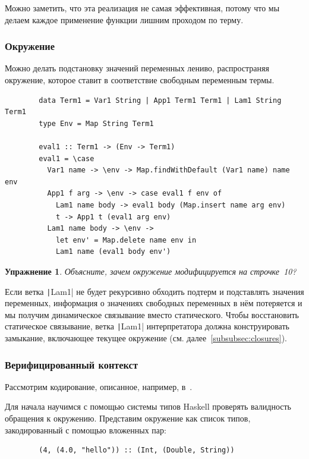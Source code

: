 \documentclass[12pt]{article}
\newtheorem{task}{Упражнение}
\begin{document}
    Можно заметить, что эта реализация не самая эффективная, потому что мы делаем каждое применение функции лишним проходом по терму.

    \subsubsection{Окружение}

    Можно делать подстановку значений переменных лениво, распространяя окружение, которое ставит в соответствие свободным переменным термы.

    \begin{verbatim}
        data Term1 = Var1 String | App1 Term1 Term1 | Lam1 String Term1
        type Env = Map String Term1

        eval1 :: Term1 -> (Env -> Term1)
        eval1 = \case
          Var1 name -> \env -> Map.findWithDefault (Var1 name) name env
          App1 f arg -> \env -> case eval1 f env of
            Lam1 name body -> eval1 body (Map.insert name arg env)
            t -> App1 t (eval1 arg env)
          Lam1 name body -> \env ->
            let env' = Map.delete name env in
            Lam1 name (eval1 body env')
    \end{verbatim}

    \begin{task}
        Объясните, зачем окружение модифицируется на строчке~10?
    \end{task}

    Если ветка \texttt|Lam1| не будет рекурсивно обходить подтерм и подставлять значения переменных, информация о значениях свободных переменных в нём потеряется и мы получим динамическое связывание вместо статического.
    Чтобы восстановить статическое связывание, ветка \texttt|Lam1| интерпретатора должна конструировать замыкание, включающее текущее окружение (см. далее~\ref{subsubsec:closures}).

    \subsubsection{Верифицированный контекст}

    Рассмотрим кодирование, описанное, например, в~\cite{kiselyov2012typed}.

    Для начала научимся с помощью системы типов Haskell проверять валидность обращения к окружению.
    Представим окружение как список типов, закодированный с помощью вложенных пар:
    \begin{verbatim}
        (4, (4.0, "hello")) :: (Int, (Double, String))
    \end{verbatim}
\end{document}
